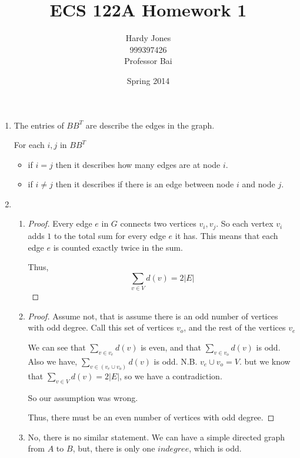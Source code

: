 \documentclass[12pt,letterpaper]{article}
\title{ECS 122A Homework 1\vspace{-2ex}}
\author{Hardy Jones\\
        999397426\\
        Professor Bai\vspace{-2ex}}
\date{Spring 2014}
\begin{document}
  \maketitle

  \begin{enumerate}
    \item
      The entries of $BB^T$ are describe the edges in the graph.

      For each $i, j$ in $BB^T$
      \begin{itemize}
        \item if $i = j$ then it describes how many edges are at node $i$.
        \item if $i \ne j$ then it describes if there is an edge between node $i$ and node $j$.
      \end{itemize}
    \item
      \begin{enumerate}
        \item
          \begin{proof}
            Every edge $e$ in $G$ connects two vertices $v_i, v_j$.
            So each vertex $v_i$ adds $1$ to the total sum for every edge $e$ it has.
            This means that each edge $e$ is counted exactly twice in the sum.

            Thus,
              \[\sum_{v \in V}{d(v)} = 2|E|\]
          \end{proof}
        \item
          \begin{proof}
            Assume not, that is assume there is an odd number of vertices with odd degree.
            Call this set of vertices $v_o$, and the rest of the vertices $v_e$

            We can see that $\sum_{v \in v_e}{d(v)}$ is even,
            and that $\sum_{v \in v_o}{d(v)}$ is odd.
            Also we have, $\sum_{v \in (v_e \cup v_o)}{d(v)}$ is odd.
            N.B. $v_e \cup v_o = V$.
            but we know that $\sum_{v \in V}{d(v)} = 2|E|$,
            so we have a contradiction.

            So our assumption was wrong.

            Thus, there must be an even number of vertices with odd degree.
          \end{proof}
        \item
          No, there is no similar statement.
          We can have a simple directed graph from $A$ to $B$,
          but, there is only one $indegree$, which is odd.
      \end{enumerate}
  \end{enumerate}
\end{document}
